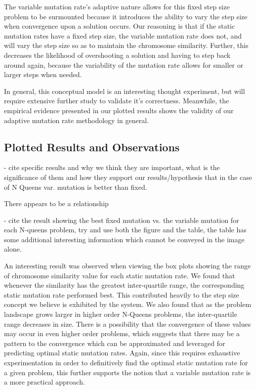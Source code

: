 \documentclass{sig-alternate}
\begin{document}
The variable mutation rate's adaptive nature allows for this fixed step size problem to be surmounted because it introduces the ability to vary the step size when convergence upon a solution occurs. Our reasoning is that if the static mutation rates have a fixed step size, the variable mutation rate does not, and will vary the step size so as to maintain the chromosome similarity. Further, this decreases the likelihood of overshooting a solution and having to step back around again, because the variability of the mutation rate allows for smaller or larger steps when needed.

In general, this conceptual model is an interesting thought experiment, but will require extensive further study to validate it's correctness. Meanwhile, the empirical evidence presented in our plotted results shows the validity of our adaptive mutation rate methodology in general.

\subsection{Plotted Results and Observations}


- cite specific results and why we think they are important, what is the significance
  of them and how they support our results/hypothesis that in the case of N Queens
  var. mutation is better than fixed.

There appears to be a relationship 

- cite the result showing the best fixed mutation vs. the variable mutation
  for each N-queens problem, try and use both the figure and the table, the table
  has some additional interesting information which cannot be conveyed in the
  image alone.

An interesting result was observed when viewing the box plots showing the range of chromosome similarity value for each static mutation rate. We found that whenever the similarity has the greatest inter-quartile range, the corresponding static mutation rate performed best. This contributed heavily to the step size concept we believe is exhibited by the system. We also found that as the problem landscape grows larger in higher order N-Queens problems, the inter-quartile range decreases in size. There is a possibility that the convergence of these values may occur in even higher order problems, which suggests that there may be a pattern to the convergence which can be approximated and leveraged for predicting optimal static mutation rates. Again, since this requires exhaustive experimentation in order to definitively find the optimal static mutation rate for a given problem, this further supports the notion that a variable mutation rate is a more practical approach.
\end{document}
